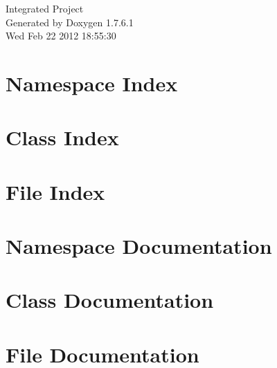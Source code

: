 \documentclass[a4paper]{book}
\begin{document}
\hypersetup{pageanchor=false,citecolor=blue}
\begin{titlepage}
\vspace*{7cm}
\begin{center}
{\Large \-Integrated \-Project }\\
\vspace*{1cm}
{\large \-Generated by Doxygen 1.7.6.1}\\
\vspace*{0.5cm}
{\small Wed Feb 22 2012 18:55:30}\\
\end{center}
\end{titlepage}
\clearemptydoublepage
{}
\tableofcontents
\clearemptydoublepage
{}
\hypersetup{pageanchor=true,citecolor=blue}
\chapter{\-Namespace \-Index}

\chapter{\-Class \-Index}

\chapter{\-File \-Index}

\chapter{\-Namespace \-Documentation}




\chapter{\-Class \-Documentation}







\chapter{\-File \-Documentation}
















\printindex
\end{document}
